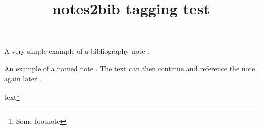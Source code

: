 \documentclass{article}
\title{notes2bib tagging test}
\begin{document}
\cite{inbook-full}

A very simple example of a bibliography note
.

\cite{manual-full}

An example of a named note . The text can then continue and reference the note again
later \bibnotemark[labelled].

text\footnote{Some footnote}



\end{document}
